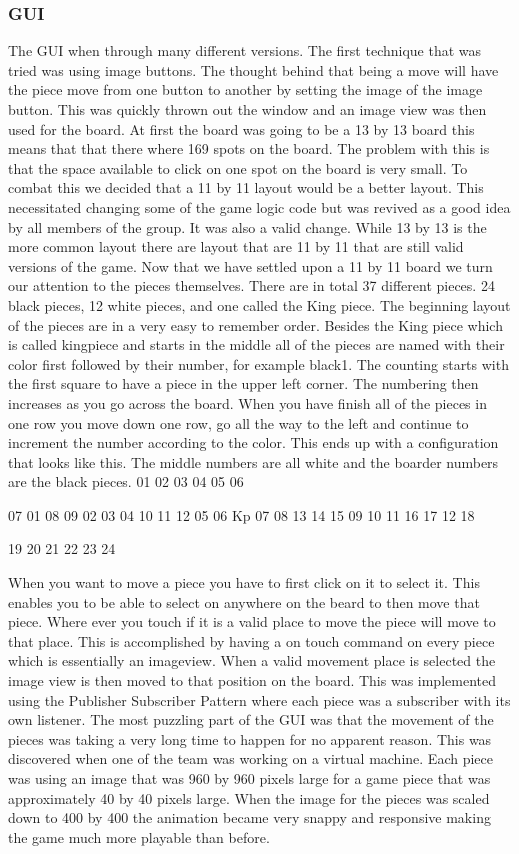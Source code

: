 \documentclass{article}
\begin{document}
\subsubsection{GUI}
	The GUI when through many different versions. The first technique that was tried was using image buttons. The thought behind that being a move will have the piece move from one button to another by setting the image of the image button. This was quickly thrown out the window and an image view was then used for the board. At first the board was going to be a 13 by 13 board this means that that there where 169 spots on the board. The problem with this is that the space available to click on one spot on the board is very small. To combat this we decided that a 11 by 11 layout would be a better layout. This necessitated changing some of the game logic code but was revived as a good idea by all members of the group. It was also a valid change. While 13 by 13 is the more common layout there are layout that are 11 by 11 that are still valid versions of the game. 
	Now that we have settled upon a 11 by 11 board we turn our attention to the pieces themselves. There are in total 37 different pieces. 24 black pieces, 12 white pieces, and one called the King piece.  The beginning layout of the pieces are in a very easy to remember order. Besides the King piece which is called kingpiece and starts in the middle all of the pieces are named with their color first followed by their number, for example black1. The counting starts with the first square to have a piece in the upper left corner. The numbering then increases as you go across the board. When you have finish all of the pieces in one row you move down one row, go all the way to the left and continue to increment the number according to the color. This ends up with a configuration that looks like this. The middle numbers are all white and the boarder numbers are the black pieces.
        01 02 03 04 05
              06
      
07            01            08
09         02 03 04         10
11 12   05 06 Kp 07 08   13 14
15         09 10 11         16
17            12            18

              19
        20 21 22 23 24

	When you want to move a piece you have to first click on it to select it. This enables you to be able to select on anywhere on the beard to then move that piece. Where ever you touch if it is a valid place to move the piece will move to that place. This is accomplished by having a on touch command on every piece which is essentially an imageview. When a valid movement place is selected the image view is then moved to that position on the board. This was implemented using the Publisher Subscriber Pattern where each piece was a subscriber with its own listener. 
	The most puzzling part of the GUI was that the movement of the pieces was taking a very long time to happen for no apparent reason. This was discovered when one of the team was working on a virtual machine. Each piece was using an image that was 960 by 960 pixels large for a game piece that was approximately 40 by 40 pixels large. When the image for the pieces was scaled down to 400 by 400 the animation became very snappy and responsive making the game much more playable than before. 
\end{document}

